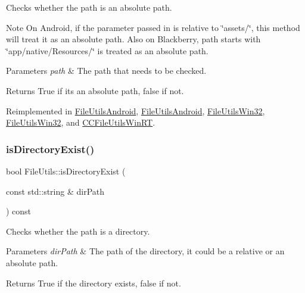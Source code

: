 Checks whether the path is an absolute path.

\begin{DoxyNote}{Note}
On Android, if the parameter passed in is relative to \char`\"{}assets/\char`\"{}, this method will treat it as an absolute path. Also on Blackberry, path starts with \char`\"{}app/native/\+Resources/\char`\"{} is treated as an absolute path.
\end{DoxyNote}

\begin{DoxyParams}{Parameters}
{\em path} & The path that needs to be checked. \\
\hline
\end{DoxyParams}
\begin{DoxyReturn}{Returns}
True if it\textquotesingle{}s an absolute path, false if not. 
\end{DoxyReturn}


Reimplemented in \hyperlink{classFileUtilsAndroid_ad13d954ba9ae2de51754965842134652}{File\+Utils\+Android}, \hyperlink{classFileUtilsAndroid_aa2d3fbd2b0938439a329a0df42ef0faa}{File\+Utils\+Android}, \hyperlink{classFileUtilsWin32_ab4ecf27c8feb35aee8894ca39d559fd7}{File\+Utils\+Win32}, \hyperlink{classFileUtilsWin32_a3427cbefa54f21aedd22ef5253a3bb46}{File\+Utils\+Win32}, and \hyperlink{classCCFileUtilsWinRT_a25ecf188d3b1724cfa64e040d2a93f7b}{C\+C\+File\+Utils\+Win\+RT}.

\mbox{\label{classFileUtils_a900bb088db70c091dd5c1984735925c1}} 
\subsubsection{\texorpdfstring{is\+Directory\+Exist()}{isDirectoryExist()}\hspace{0.1cm}{\footnotesize\ttfamily [1/3]}}
{\footnotesize\ttfamily bool File\+Utils\+::is\+Directory\+Exist (\begin{DoxyParamCaption}\item[{const std\+::string \&}]{dir\+Path }\end{DoxyParamCaption}) const\hspace{0.3cm}{\ttfamily [virtual]}}

Checks whether the path is a directory.


\begin{DoxyParams}{Parameters}
{\em dir\+Path} & The path of the directory, it could be a relative or an absolute path. \\
\hline
\end{DoxyParams}
\begin{DoxyReturn}{Returns}
True if the directory exists, false if not. 
\end{DoxyReturn}
\mbox{\label{classFileUtils_a24d3890687e080dccd916ce946012c96}} 
